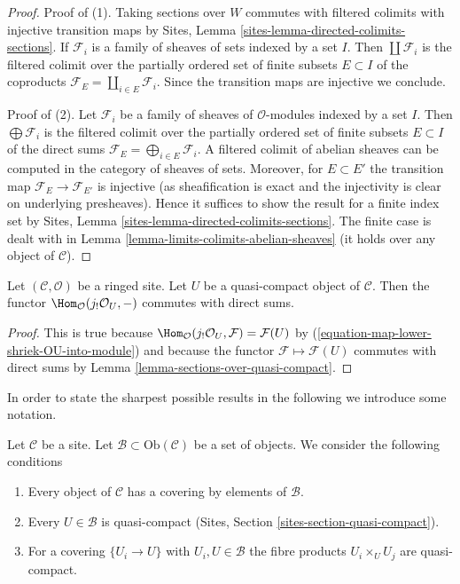 \begin{proof}
Proof of (1). Taking sections over $W$ commutes with filtered colimits
with injective transition maps by
Sites, Lemma \ref{sites-lemma-directed-colimits-sections}.
If $\mathcal{F}_i$ is a family of sheaves of sets
indexed by a set $I$. Then $\coprod \mathcal{F}_i$ is the filtered
colimit over the partially ordered set of finite subsets
$E \subset I$ of the coproducts
$\mathcal{F}_E = \coprod_{i \in E} \mathcal{F}_i$.
Since the transition maps are injective we conclude.

\medskip\noindent
Proof of (2).
Let $\mathcal{F}_i$ be a family of sheaves of $\mathcal{O}$-modules
indexed by a set $I$. Then $\bigoplus \mathcal{F}_i$ is the filtered
colimit over the partially ordered set of finite subsets
$E \subset I$ of the direct sums
$\mathcal{F}_E = \bigoplus_{i \in E} \mathcal{F}_i$.
A filtered colimit of abelian sheaves can be computed in the
category of sheaves of sets. Moreover, for $E \subset E'$ the transition map
$\mathcal{F}_E \to \mathcal{F}_{E'}$ is injective (as sheafification
is exact and the injectivity is clear on underlying presheaves).
Hence it suffices to show the result for a finite index set by
Sites, Lemma \ref{sites-lemma-directed-colimits-sections}.
The finite case is dealt with in
Lemma \ref{lemma-limits-colimits-abelian-sheaves}
(it holds over any object of $\mathcal{C}$).
\end{proof}

\begin{lemma}
\label{lemma-quasi-compact-hom-from}
Let $(\mathcal{C}, \mathcal{O})$ be a ringed site. Let $U$ be a quasi-compact
object of $\mathcal{C}$. Then the functor
$\Hom_\mathcal{O}(j_!\mathcal{O}_U, -)$ commutes with direct sums.
\end{lemma}

\begin{proof}
This is true because
$\Hom_\mathcal{O}(j_!\mathcal{O}_U, \mathcal{F}) = \mathcal{F}(U)$
by (\ref{equation-map-lower-shriek-OU-into-module})
and because the functor $\mathcal{F} \mapsto \mathcal{F}(U)$
commutes with direct sums by
Lemma \ref{lemma-sections-over-quasi-compact}.
\end{proof}

\noindent
In order to state the sharpest possible results in the following
we introduce some notation.

\begin{situation}
\label{situation-quasi-compact-objects}
Let $\mathcal{C}$ be a site. Let
$\mathcal{B} \subset \text{Ob}(\mathcal{C})$ be a set
of objects. We consider the following conditions
\begin{enumerate}
\item
\label{item-enough}
Every object of $\mathcal{C}$ has a covering by elements of $\mathcal{B}$.
\item
\label{item-enough-qc}
Every $U \in \mathcal{B}$ is quasi-compact
(Sites, Section \ref{sites-section-quasi-compact}).
\item
\label{item-enough-qc-qs}
For a covering $\{U_i \to U\}$ with $U_i, U \in \mathcal{B}$
the fibre products $U_i \times_U U_j$ are quasi-compact.
\end{enumerate}
\end{situation}

